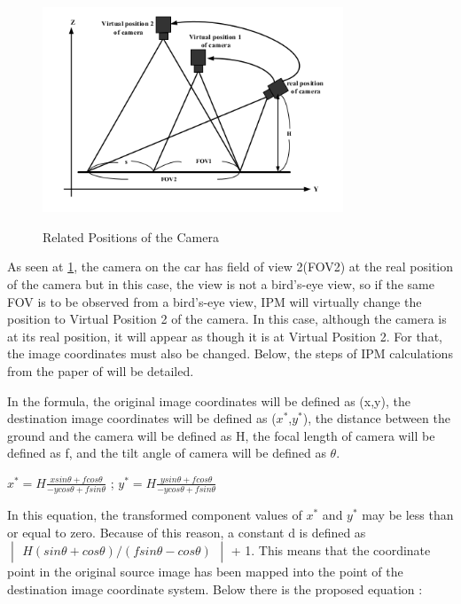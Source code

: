   
\begin{figure}[H]
\centering
  \includegraphics[width=0.8\textwidth]{./Bilder/Related_positions_of_the_camera.png}\label{Procedures_of_IPM}
  \caption{Related Positions of the Camera \cite{IPM}}
\end{figure}

 As seen at \ref{Procedures_of_IPM}, the camera on the car has field of view 2(FOV2) at the real position of the camera but in this case, the view is not a bird's-eye view, so if the same FOV is to be observed from a bird's-eye view, IPM will virtually change the position to Virtual Position 2 of the camera. In this case, although the camera is at its real position, it will appear as though it is at Virtual Position 2. For that, the image coordinates must also be changed. Below, the steps of IPM calculations from the paper of \cite{IPM} will be detailed.
 
In the formula, the original image coordinates will be defined as (x,y), the destination image coordinates will be defined as ($x^*$,$y^*$), the distance between the ground and the camera will be defined as H, the focal length of camera will be defined as f, and the tilt angle of camera will be defined as $\theta$.
 
\begin{center}
 $x^* = H \frac{x sin \theta + f cos \theta}{-y cos \theta + f sin \theta}$ ;
 $y^* = H \frac{y sin \theta + f cos \theta}{-y cos \theta + f sin \theta}$ 
\end{center}

In this equation, the transformed component values of $x^*$ and $y^*$ may be less than or equal to zero. Because of 
this reason, a constant d is defined as $
\begin{vmatrix}
H(sin \theta + cos \theta)/(f sin \theta - cos \theta) 
\end{vmatrix}
$  + 1. This means that the coordinate point in the original source image has been mapped into the point of the destination image coordinate system. Below there is the proposed equation :
 
